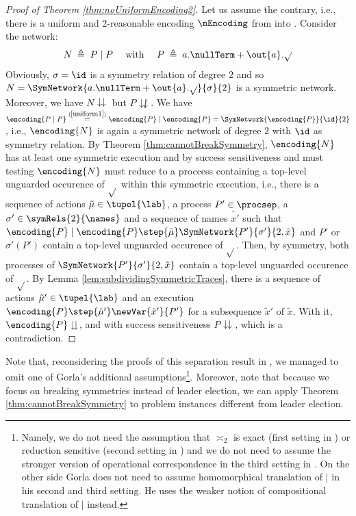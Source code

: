 \documentclass[11pt,techReport]{eptcs}
\begin{document}
\begin{proof}[Proof of Theorem \ref{thm:noUniformEncoding2}]
	Let us assume the contrary, i.e., there is a uniform and 2-reasonable encoding $ \nEncoding $ from \pimix into \pisep. Consider the network:
	\begin{align*}
		N \; \triangleq \; P \mid P \quad \text{ with } \quad P \; \triangleq \; a.\nullTerm + \out{a}.\sqrt{}
	\end{align*}
	Obviously, $ \sigma = \id $ is a symmetry relation of degree $ 2 $ and so $ N = \SymNetwork{a.\nullTerm + \out{a}.\sqrt{}}{\sigma}{2} $ is a symmetric network. Moreover, we have $ N \downdownarrows $ but $ P \not\downdownarrows $. We have $ \encoding{P \mid P} \stackrel{(\ref{uniform1})}= \encoding{P} \mid \encoding{P} = \SymNetwork{\encoding{P}}{\id}{2} $, i.e., $ \encoding{N} $ is again a symmetric network of degree $ 2 $ with $ \id $ as symmetry relation. By Theorem \ref{thm:cannotBreakSymmetry}, $ \encoding{N} $ has at least one symmetric execution and by success sensitiveness and must testing $ \encoding{N} $ must reduce to a proccess containing a top-level unguarded occurence of $ \sqrt{} $ within this symmetric execution, i.e., there is a sequence of actions $ \tilde{\mu} \in \tupel{\lab} $, a process $ P' \in \procsep $, a $ \sigma' \in \symRels{2}{\names} $ and a sequence of names $ \tilde{x'} $ such that $ \encoding{P} \mid \encoding{P} \step{\tilde{\mu}} \SymNetwork{P'}{\sigma'}{2, \tilde{x}} $ and $ P' $ or $ \sigma'\left( P' \right) $ contain a top-level unguarded occurence of $ \sqrt{} $. Then, by symmetry, both processes of $ \SymNetwork{P'}{\sigma'}{2, \tilde{x}} $ contain a top-level unguarded occurence of $ \sqrt{} $. By Lemma \ref{lem:subdividingSymmetricTraces}, there is a sequence of actions $ \tilde{\mu}' \in \tupel{\lab} $ and an execution $ \encoding{P} \step{\tilde{\mu}'} \newVar{\tilde{x}'}{P'} $ for a subsequence $ \tilde{x}' $ of $ \tilde{x} $. With it, $ \encoding{P} \downdownarrows $, and with success sensitiveness $ P \downdownarrows $, which is a contradiction.
\end{proof}

Note that, reconsidering the proofs of this separation result in \cite{gorla08d}, we managed to omit one of Gorla's additional assumptions\footnote{Namely, we do not need the assumption that $ \asymp_2 $ is exact (first setting in \cite{gorla08d}) or reduction sensitive (second setting in \cite{gorla08d}) and we do not need to assume the stronger version of operational correspondence in the third setting in \cite{gorla08d}. On the other side Gorla does not need to assume homomorphical translation of $ | $ in his second and third setting. He uses the weaker notion of compositional translation of $ | $ instead.}. Moreover, note that because we focus on breaking symmetries instead of leader election, we can apply Theorem \ref{thm:cannotBreakSymmetry} to problem instances different from leader election.
\end{document}
